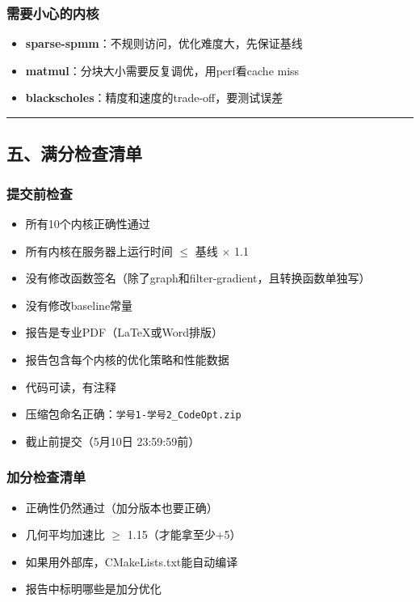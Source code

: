 \documentclass[11pt, a4paper]{article}
\begin{document}
\begin{aibox}
\subsubsection*{需要小心的内核}
\begin{itemize}
    \item \textbf{sparse-spmm}：不规则访问，优化难度大，先保证基线
    \item \textbf{matmul}：分块大小需要反复调优，用perf看cache miss
    \item \textbf{blackscholes}：精度和速度的trade-off，要测试误差
\end{itemize}

\begin{center}\rule{\textwidth}{0.4pt}\end{center}

\subsection*{五、满分检查清单}

\subsubsection*{提交前检查}
\begin{itemize}
    \item[$\square$] 所有10个内核正确性通过
    \item[$\square$] 所有内核在服务器上运行时间 $\le$ 基线 $\times$ 1.1
    \item[$\square$] 没有修改函数签名（除了graph和filter-gradient，且转换函数单独写）
    \item[$\square$] 没有修改baseline常量
    \item[$\square$] 报告是专业PDF（LaTeX或Word排版）
    \item[$\square$] 报告包含每个内核的优化策略和性能数据
    \item[$\square$] 代码可读，有注释
    \item[$\square$] 压缩包命名正确：\texttt{学号1-学号2\_CodeOpt.zip}
    \item[$\square$] 截止前提交（5月10日 23:59:59前）
\end{itemize}

\subsubsection*{加分检查清单}
\begin{itemize}
    \item[$\square$] 正确性仍然通过（加分版本也要正确）
    \item[$\square$] 几何平均加速比 $\ge$ 1.15（才能拿至少+5）
    \item[$\square$] 如果用外部库，CMakeLists.txt能自动编译
    \item[$\square$] 报告中标明哪些是加分优化
\end{itemize}


\end{aibox}
\end{document}
